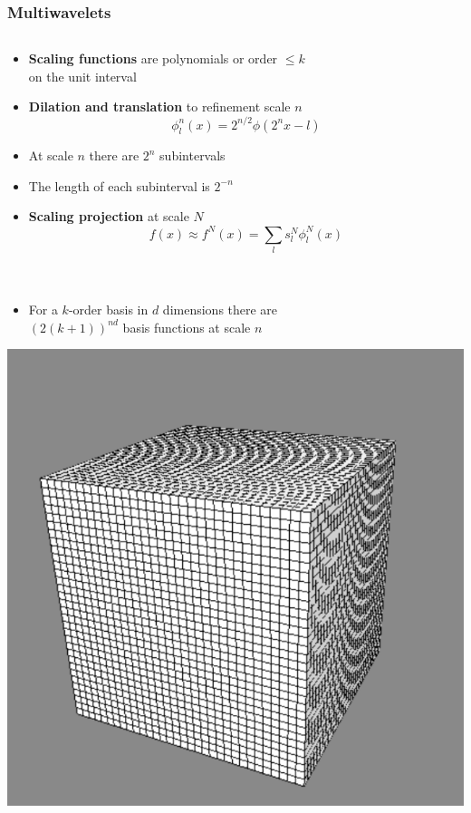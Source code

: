 \documentclass[mathserif, 8pt]{beamer}
\begin{document}
\begin{frame}
    \frametitle{Multiwavelets}
    \begin{columns}
    \begin{column}[b]{0.55\linewidth}
	\begin{itemize}
	    \item   \textbf{Scaling functions} are polynomials or order $\leq k$\\
		    on the unit interval
	    \item   \textbf{Dilation and translation} to refinement scale $n$
		    \begin{equation}
			\nonumber
			\phi_l^n(x) = 2^{n/2}\phi(2^nx-l)
		    \end{equation}
	    \item   At scale $n$ there are $2^n$ subintervals
	    \item   The length of each subinterval is $2^{-n}$
	    \item   \textbf{Scaling projection} at scale $N$
		    \begin{equation}
			\nonumber
			f(x) \approx f^N(x) = \sum_l s_l^N \phi_l^N(x)
		    \end{equation}
		    \ \\
		    \ \\
	    \item   For a $k$-order basis in $d$ dimensions there are\\
		    $\left(2(k+1)\right)^{nd}$ basis functions at scale $n$\\
	\end{itemize}
	\centering
	\includegraphics[scale=0.2]{figures/unifgrid.pdf}

\end{column}
\end{columns}
\end{frame}
\end{document}
